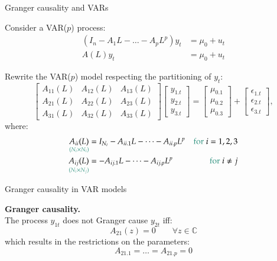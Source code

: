 \documentclass[notes,blackandwhite,mathsans,usenames,dvipsnames]{beamer}
\begin{document}
\begin{frame} {Granger causality and VARs}
\small

{\color{mcxs2}Consider a} VAR($p$) {\color{mcxs2}process:}
\begin{align*} 
(I_n - A_1L - \dots - A_pL^p) y_t &= \mu_0 + u_t \\
A(L) y_t &= \mu_0 + u_t 
\end{align*} 

{\color{mcxs1}Rewrite} {\color{mcxs2}the VAR($p$) model respecting the partitioning of $y_t$:}
$$ \begin{bmatrix} A_{11}(L) & A_{12}(L) & A_{13}(L) \\ A_{21}(L) & A_{22}(L) & A_{23}(L) \\ A_{31}(L) & A_{32}(L) & A_{33}(L)\end{bmatrix}\begin{bmatrix} y_{1.t} \\ y_{2.t} \\ y_{3.t} \end{bmatrix} = \begin{bmatrix} \mu_{0.1} \\ \mu_{0.2} \\ \mu_{0.3} \end{bmatrix} +  \begin{bmatrix} \epsilon_{1.t} \\ \epsilon_{2.t} \\ \epsilon_{3.t} \end{bmatrix}, $$
{\color{mcxs2}where:}
\begin{align*}
\underset{\color{mcxs2}(N_i\times N_i)}{A_{ii}(L)} &= I_{N_i} - A_{ii.1}L - \dots - A_{ii.p}L^p & \text{\color{mcxs2}for } i = 1,2, 3\\
\underset{\color{mcxs2}(N_i\times N_j)}{A_{ij}(L)} &= - A_{ij.1}L - \dots - A_{ij.p}L^p  & \text{\color{mcxs2}for } i\neq j\\
\end{align*}
\end{frame}


\begin{frame}{Granger causality in VAR models}

\small
\textbf{Granger causality.}\\
{\color{mcxs2}The process} $y_{1t}$ {\color{mcxs2}does} {\color{mcxs1}not Granger cause} $y_{2t}$ {\color{mcxs2} iff:}
$$ A_{21}(z) = 0 \qquad \forall z\in \mathbb{C} $$
{\color{mcxs2}which results in the restrictions on the parameters:}
$$ A_{21.1} = \dots = A_{21.p} = 0 $$

\end{frame}
\end{document}
